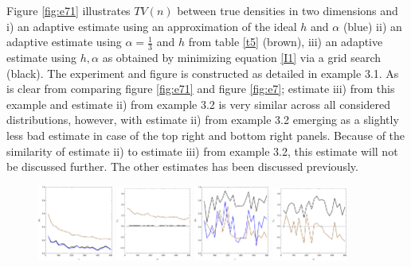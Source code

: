 \documentclass[
twoside,
openright,
titlepage,
numbers=noenddot,
headinclude,%
footinclude=true,
dottedtoc, %
ngerman,
american, %
pagesize=pdftex,
]{book}
\begin{document}
	\begin{example}
		Figure \ref{fig:e71} illustrates $TV(n)$ between true densities in two dimensions and i) an adaptive estimate using an approximation of the ideal $h$ and $\alpha$ (blue) ii) an adaptive estimate using $\alpha=\frac{1}{3}$ and $h$ from table \ref{t5} (brown), iii) an adaptive estimate using $h,\alpha$ as obtained by minimizing equation \eqref{I1} via a grid search (black). The experiment and figure is constructed as detailed in example 3.1.\newline
		As is clear from comparing figure \ref{fig:e71} and figure \ref{fig:e7}; estimate iii) from this example and estimate ii) from example 3.2 is very similar across all considered distributions, however, with estimate ii) from example 3.2 emerging as a slightly less bad estimate in case of the top right and bottom right panels. Because of the similarity of estimate ii) to estimate iii) from example 3.2, this estimate will not be discussed further. The other estimates has been discussed previously.
		\begin{figure}[H]
			\centering
			\captionsetup{width=0.95\textwidth}
			\includegraphics[width=0.22\textwidth]{figures/2DTVexamples/e3n1}
			\includegraphics[width=0.22\textwidth]{figures/2DTVexamples/e3n2}
			\includegraphics[width=0.22\textwidth]{figures/2DTVexamples/e3t1}
			\includegraphics[width=0.22\textwidth]{figures/2DTVexamples/e3t2}

\end{figure}
\end{example}
\end{document}
